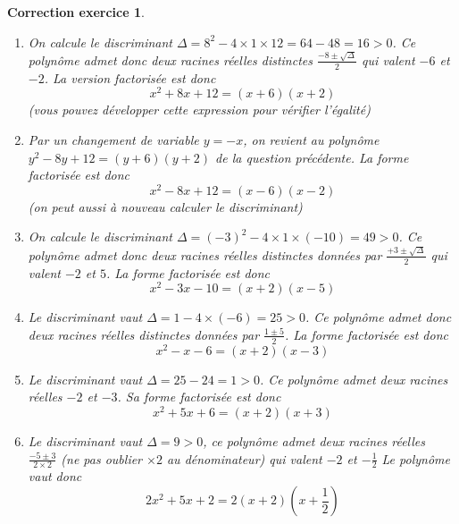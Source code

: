 \documentclass[12pt]{article}
\newtheorem{correction}{\bf Correction exercice}
\newenvironment{cor}{
\begin{correction}\smallskip\normalfont}{\end{correction}
}
\newif\ifcorrige\corrigetrue
\begin{document}
\ifcorrige
\color{magenta}
\begin{cor}
  $\qquad$
\begin{enumerate}
\item On calcule le discriminant
  $\Delta = 8^2 - 4\times 1 \times 12 = 64 - 48 = 16 > 0$.
  Ce polyn\^ome admet donc deux racines r\'eelles distinctes
  $\frac{-8 \pm \sqrt{\Delta}}{2}$ qui valent $-6$ et $-2$.
  La version factoris\'ee est donc
  \begin{equation*}
    x^2 + 8x + 12
    =
    (x+6)(x+2)
  \end{equation*}
  (vous pouvez d\'evelopper cette expression pour v\'erifier l'\'egalit\'e)
\item Par un changement de variable $y=-x$, on revient au polyn\^ome
  $y^2-8y+12 = (y+6)(y+2)$ de la question pr\'ec\'edente.
  La forme factoris\'ee est donc
  \begin{equation*}
    x^2 - 8x + 12
    =
    (x-6)(x-2)
  \end{equation*}
  (on peut aussi \`a nouveau calculer le discriminant)
\item On calcule le discriminant
  $\Delta = (-3)^2 -4 \times 1 \times (-10) = 49 > 0$.
  Ce polyn\^ome admet donc deux racines r\'eelles distinctes donn\'ees par
  $\frac{+3\pm \sqrt{\Delta}}{2}$ qui valent $-2$ et $5$.
  La forme factoris\'ee est donc
  \begin{equation*}
    x^2-3x-10 = (x+2)(x-5)
  \end{equation*}
\item Le discriminant vaut $\Delta = 1 - 4 \times (-6) = 25 > 0$.
  Ce polyn\^ome admet donc deux racines r\'eelles distinctes
  donn\'ees par $\frac{1 \pm 5}{2}$.
  La forme factoris\'ee est donc
  \begin{equation*}
    x^2-x-6 = (x+2)(x-3)
  \end{equation*}
\item Le discriminant vaut $\Delta = 25 - 24 = 1>0$.
  Ce polyn\^ome admet deux racines r\'eelles $-2$ et $-3$.
  Sa forme factoris\'ee est donc
  \begin{equation*}
    x^2+5x+6 = (x+2)(x+3)
  \end{equation*}
\item
  Le discriminant vaut $\Delta = 9 > 0$, ce polyn\^ome admet deux racines r\'eelles
  $\frac{-5 \pm 3}{2\times 2}$ (ne pas oublier $\times 2$ au d\'enominateur)
  qui valent $-2$ et $-\frac12$
  Le polyn\^ome vaut donc
  \begin{equation*}
    2x^2+5x+2 = 2(x+2)(x+\frac12)

\end{equation*}
\end{enumerate}
\end{cor}
\end{document}
